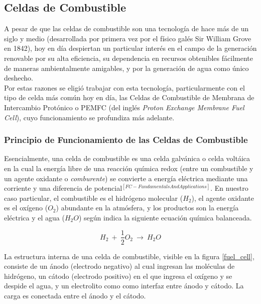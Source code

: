 \subsection{Celdas de Combustible}

A pesar de que las celdas de combustible son una tecnología de hace más de un siglo y medio (desarrollada por primera vez por el físico galés Sir William Grove en 1842), hoy en día despiertan un particular interés en el campo de la generación renovable por su alta eficiencia, su dependencia en recursos obtenibles fácilmente de maneras ambientalmente amigables, y por la generación de agua como único deshecho.\\

Por estas razones se eligió trabajar con esta tecnología, particularmente con el tipo de celda más común hoy en día, las Celdas de Combustible de Membrana de Intercambio Protónico o PEMFC (del inglés \textit{Proton Exchange Membrane Fuel Cell}), cuyo funcionamiento se profundiza más adelante.\\

\subsubsection{Principio de Funcionamiento de las Celdas de Combustible}

Esencialmente, una celda de combustible es una celda galvánica o celda voltáica en la cual la energía libre de una reacción química redox (entre un combustible y un agente oxidante o \textit{comburente}) se convierte a energía eléctrica mediante una corriente y una diferencia de potencial$^{[FC-FundamentalsAndApplications]}$. En nuestro caso particular, el combustible es el hidrógeno molecular ($H_2$), el agente oxidante es el oxígeno ($O_2$) abundante en la atmósfera, y los productos son la energía eléctrica y el agua ($H_2O$) según indica la siguiente ecuación química balanceada.

\begin{equation}\label{redox_celda}
    H_2\ +\ \frac{1}{2}O_2\ \longrightarrow\ H_2O
\end{equation}

La estructura interna de una celda de combustible, visible en la figura \ref{fuel_cell}, consiste de un ánodo (electrodo negativo) al cual ingresan las moléculas de hidrógeno, un cátodo (electrodo positivo) en el que ingresa el oxígeno y se despide el agua, y un electrolito como como interfaz entre ánodo y cátodo. La carga es conectada entre el ánodo y el cátodo.

